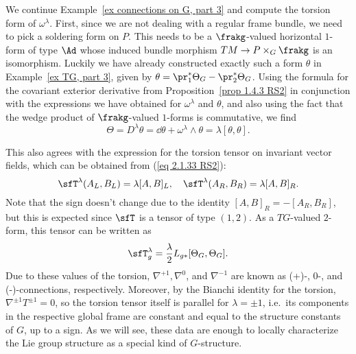 \begin{example}\label{ex connections on G, part 4}
    We continue Example~\ref{ex connections on G, part 3} and compute the torsion form of $\omega^\lambda$. First, since we are not dealing with a regular frame bundle, we need to pick a soldering form on $P$. This needs to be a $\frakg$-valued horizontal $1$-form of type $\Ad$ whose induced bundle morphism $TM\to P\times_G \frakg$ is an isomorphism. Luckily we have already constructed exactly such a form $\theta$ in Example~\ref{ex TG, part 3}, given by $\theta=\pr_1^\ast\Theta_G-\pr_2^\ast\Theta_G$. 
    Using the formula for the covariant exterior derivative from Proposition~\ref{prop 1.4.3 RS2} in conjunction with the expressions we have obtained for $\omega^\lambda$ and $\theta$, and also using the fact that the wedge product of $\frakg$-valued $1$-forms is commutative, we find
    \[\Theta=D^\lambda \theta=\dd \theta+\omega^\lambda\wedge \theta=\lambda[\theta,\theta].\]

    This also agrees with the expression for the torsion tensor on invariant vector fields, which can be obtained from (\ref{eq 2.1.33 RS2}):
    \[\sfT^\lambda(A_L,B_L)=\lambda[A,B]_L,\quad \sfT^\lambda(A_R,B_R)=\lambda [A,B]_R.\]
    Note that the sign doesn't change due to the identity $[A,B]_R=-[A_R,B_R]$, but this is expected since $\sfT$ is a tensor of type $(1,2)$. 
    As a $TG$-valued $2$-form, this tensor can be written as 
    \[\sfT^\lambda_g=\frac{\lambda}{2} L_{g\ast}[\Theta_G,\Theta_G].\label{3791731}\]
    Due to these values of the torsion, $\nabla^{+1},\nabla^0$, and $\nabla^{-1}$ are known as (+)-, 0-, and (-)-connections, respectively. 
    Moreover, by the  Bianchi identity for the torsion, $\nabla^{\pm 1}T^{\pm 1}=0$, so the torsion tensor itself is parallel for $\lambda=\pm 1$, i.e.\ its components in the respective global frame are constant and equal to the structure constants of $G$, up to a sign. As we will see, these data are enough to locally characterize the Lie group structure as a special kind of $G$-structure.


\end{example}
